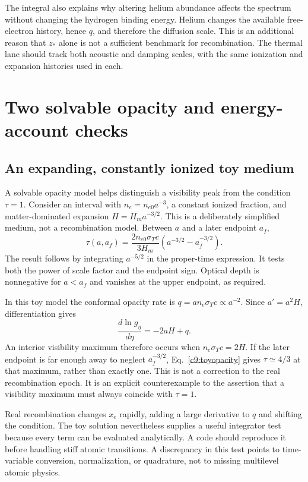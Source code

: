 The integral also explains why altering helium abundance affects the spectrum without changing the hydrogen binding energy. Helium changes the available free-electron history, hence $q$, and therefore the diffusion scale. This is an additional reason that $z_*$ alone is not a sufficient benchmark for recombination. The thermal lane should track both acoustic and damping scales, with the same ionization and expansion histories used in each.

\section{Two solvable opacity and energy-account checks}
\subsection{An expanding, constantly ionized toy medium}

A solvable opacity model helps distinguish a visibility peak from the condition $\tau=1$. Consider an interval with $n_e=n_{e0}a^{-3}$, a constant ionized fraction, and matter-dominated expansion $H=H_m a^{-3/2}$. This is a deliberately simplified medium, not a recombination model. Between $a$ and a later endpoint $a_f$,
\begin{equation}
 \tau(a,a_f)=\frac{2n_{e0}\sigma_Tc}{3H_m}
 \left(a^{-3/2}-a_f^{-3/2}\right).
 \label{c9:toyopacity}
\end{equation}
The result follows by integrating $a^{-5/2}$ in the proper-time expression. It tests both the power of scale factor and the endpoint sign. Optical depth is nonnegative for $a<a_f$ and vanishes at the upper endpoint, as required.

In this toy model the conformal opacity rate is $q=a n_e\sigma_Tc\propto a^{-2}$. Since $a'=a^2H$, differentiation gives
\begin{equation}
 \frac{d\ln g_\eta}{d\eta}=-2aH+q.
 \label{c9:toypeak}
\end{equation}
An interior visibility maximum therefore occurs when $n_e\sigma_Tc=2H$. If the later endpoint is far enough away to neglect $a_f^{-3/2}$, Eq.~\eqref{c9:toyopacity} gives $\tau\simeq4/3$ at that maximum, rather than exactly one. This is not a correction to the real recombination epoch. It is an explicit counterexample to the assertion that a visibility maximum must always coincide with $\tau=1$.

Real recombination changes $x_e$ rapidly, adding a large derivative to $q$ and shifting the condition. The toy solution nevertheless supplies a useful integrator test because every term can be evaluated analytically. A code should reproduce it before handling stiff atomic transitions. A discrepancy in this test points to time-variable conversion, normalization, or quadrature, not to missing multilevel atomic physics.

